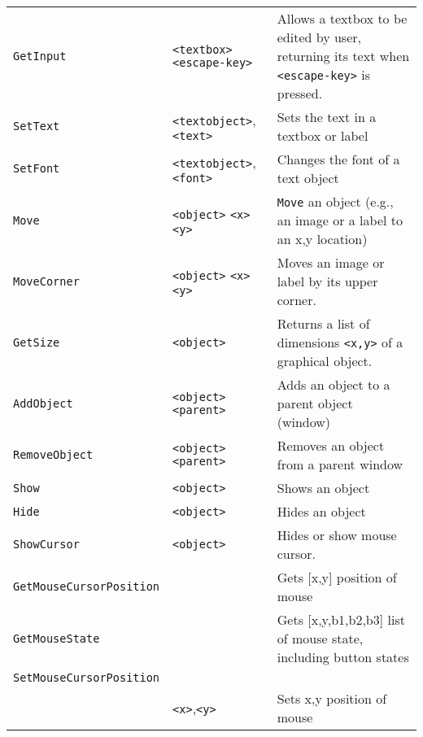 \begin{longtable}{p{3cm}p{3cm}p{6cm}}
\verb+GetInput+ &\verb+<textbox>+ \verb+<escape-key>+& Allows a textbox to be edited by user, returning its text when \verb+<escape-key>+ is pressed.\\ 
\verb+SetText+ &\verb+<textobject>+, \verb+<text>+ &Sets the text in a textbox or label\\ 
\verb+SetFont+ &\verb+<textobject>+, \verb+<font>+ &Changes the font of a text object \\ 
\verb+Move+ &\verb+<object>+ \verb+<x>+ \verb+<y>+& \verb+Move+ an object (e.g., an image or a label to an x,y location) \\ 
\verb+MoveCorner+ &\verb+<object>+ \verb+<x>+ \verb+<y>+& Moves an image or label by its upper corner.\\ 
\verb+GetSize+ &\verb+<object>+ &Returns a list of dimensions \verb+<x,y>+ of a graphical object.\\ 
\verb+AddObject+ &\verb+<object>+ \verb+<parent>+ & Adds an object to a parent object (window)\\ 
\verb+RemoveObject+ &\verb+<object>+ \verb+<parent>+ &Removes an object from a parent window\\ 
\verb+Show+ &\verb+<object>+ &Shows an object\\ 
\verb+Hide+ &\verb+<object>+ &Hides an object\\ 
\verb+ShowCursor+ &\verb+<object>+ &Hides or show mouse cursor.\\
\verb+GetMouseCursorPosition+ & &Gets [x,y] position of mouse\\
\verb+GetMouseState+&&Gets [x,y,b1,b2,b3] list of mouse state, including button states\\
\verb+SetMouseCursorPosition+ \\
&\verb+<x>+,\verb+<y>+ &Sets x,y position of mouse\\


\end{longtable}
